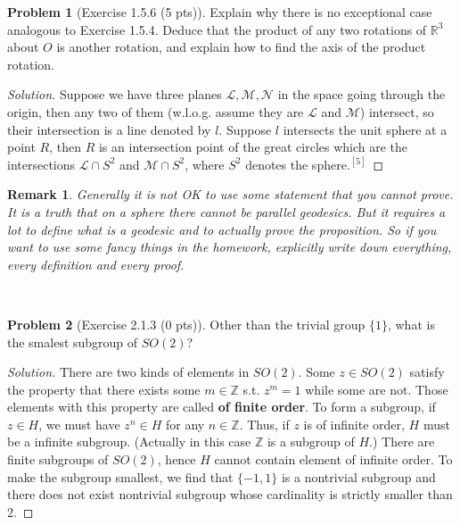 \documentclass{article}
\theoremstyle{definition}
\newtheorem{problem}{Problem}
\theoremstyle{plain}
\newtheorem*{remark}{Remark}
\begin{document}
\begin{problem}[Exercise 1.5.6 (5 pts)]Explain why there is no exceptional case analogous to Exercise 1.5.4. Deduce that the product of any two rotations of $\mathbb{R}^3$ about $O$ is another rotation, and explain how to find the axis of the product rotation.
\end{problem}
\begin{adjustwidth}{0.7cm}{}
\color{blue}
\begin{proof}[Solution]Suppose we have three planes $\mathscr{L},\mathscr{M},\mathscr{N}$ in the space going through the origin, then any two of them (w.l.o.g. assume they are $\mathscr{L}$ and $\mathscr{M}$) intersect, so their intersection is a line denoted by $l$. Suppose $l$ intersects the unit sphere at a point $R$, then $R$ is an intersection point of the great circles which are the intersections $\mathscr{L}\cap S^2$ and $\mathscr{M}\cap S^2$, where $S^2$ denotes the sphere$.^{[5]}$
\end{proof}
\color{black}
\end{adjustwidth}

\begin{remark}Generally it is not OK to use some statement that you cannot prove. It is a truth that on a sphere there cannot be parallel geodesics. But it requires a lot to define what is a geodesic and to actually prove the proposition. So if you want to use some fancy things in the homework, explicitly write down everything, every definition and every proof.
\end{remark}
~\par

\begin{problem}[Exercise 2.1.3 (0 pts)]Other than the trivial group $\{1\}$, what is the smalest subgroup of $SO(2)$?
\end{problem}
\begin{adjustwidth}{0.7cm}{}
\color{blue}
\begin{proof}[Solution]There are two kinds of elements in $SO(2)$. Some $z\in SO(2)$ satisfy the property that there exists some $m\in\mathbb{Z}$ s.t. $z^m=1$ while some are not. Those elements with this property are called \textbf{of finite order}. To form a subgroup, if $z\in H$, we must have $z^n\in H$ for any $n\in\mathbb{Z}$. Thus, if $z$ is of infinite order, $H$ must be a infinite subgroup. (Actually in this case $\mathbb{Z}$ is a subgroup of $H$.) There are finite subgroups of $SO(2)$, hence $H$ cannot contain element of infinite order. To make the subgroup smallest, we find that $\{-1,1\}$ is a nontrivial subgroup and there does not exist nontrivial subgroup whose cardinality is strictly smaller than 2.
\end{proof}
\color{black}
\end{adjustwidth}
~\par
\end{document}
